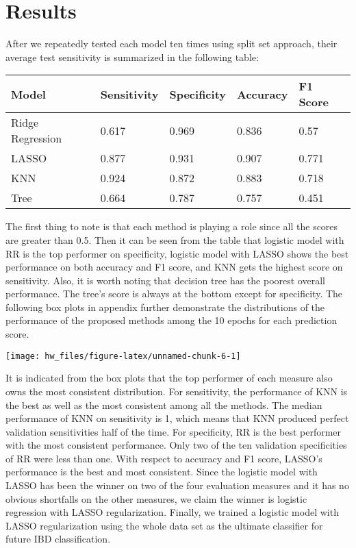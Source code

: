 \documentclass[preprint, 3p,
authoryear]{elsarticle} %
\begin{document}
\hypertarget{results}{%
\section{Results}\label{results}}

After we repeatedly tested each model ten times using split set
approach, their average test sensitivity is summarized in the following
table:

\begin{table}[H]
\centering
\begin{tabular}{l|l|l|l|l}
\hline
Model & Sensitivity & Specificity & Accuracy & F1 Score\\
\hline
Ridge Regression & 0.617 & 0.969 & 0.836 & 0.57\\
\hline
LASSO & 0.877 & 0.931 & 0.907 & 0.771\\
\hline
KNN & 0.924 & 0.872 & 0.883 & 0.718\\
\hline
Tree & 0.664 & 0.787 & 0.757 & 0.451\\
\hline
\end{tabular}
\end{table}

The first thing to note is that each method is playing a role since all
the scores are greater than 0.5. Then it can be seen from the table that
logistic model with RR is the top performer on specificity, logistic
model with LASSO shows the best performance on both accuracy and F1
score, and KNN gets the highest score on sensitivity. Also, it is worth
noting that decision tree has the poorest overall performance. The
tree's score is always at the bottom except for specificity. The
following box plots in appendix further demonstrate the distributions of
the performance of the proposed methods among the 10 epochs for each
prediction score.

\begin{center}\texttt{[image: hw\_files/figure-latex/unnamed-chunk-6-1]} \end{center}

It is indicated from the box plots that the top performer of each
measure also owns the most consistent distribution. For sensitivity, the
performance of KNN is the best as well as the most consistent among all
the methods. The median performance of KNN on sensitivity is 1, which
means that KNN produced perfect validation sensitivities half of the
time. For specificity, RR is the best performer with the most consistent
performance. Only two of the ten validation specificities of RR were
less than one. With respect to accuracy and F1 score, LASSO's
performance is the best and most consistent. Since the logistic model
with LASSO has been the winner on two of the four evaluation measures
and it has no obvious shortfalls on the other measures, we claim the
winner is logistic regression with LASSO regularization. Finally, we
trained a logistic model with LASSO regularization using the whole data
set as the ultimate classifier for future IBD classification.
\end{document}
